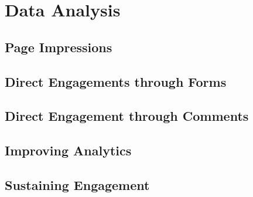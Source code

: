 %
%

\pagebreak
\section{Data Analysis}

\onehalfspacing

\subsection{Page Impressions}

\subsection{Direct Engagements through Forms}

\subsection{Direct Engagement through Comments}

\subsection{Improving Analytics}

\subsection{Sustaining Engagement}

